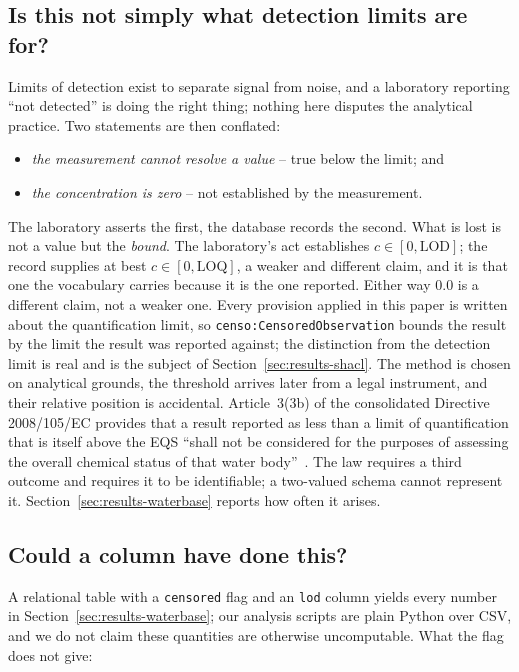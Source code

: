 \subsection{Is this not simply what detection limits are for?}
\label{sec:methods-noise}
Limits of detection exist to separate signal from noise, and a laboratory
reporting ``not detected'' is doing the right thing; nothing here disputes the
analytical practice. Two statements are then conflated:

\begin{itemize}
  \item \emph{the measurement cannot resolve a value} -- true below the limit;
    and
  \item \emph{the concentration is zero} -- not established by the measurement.
\end{itemize}

The laboratory asserts the first, the database records the second. What is lost
is not a value but the \emph{bound}. The laboratory's act establishes $c \in
[0,\mathrm{LOD}]$; the record supplies at best $c \in [0,\mathrm{LOQ}]$, a
weaker and different claim, and it is that one the vocabulary carries because it
is the one reported. Either way \num{0.0} is a different claim, not a weaker
one. Every provision applied in this paper is written about the quantification
limit, so \texttt{censo:CensoredObservation} bounds the result by the limit the
result was reported against; the distinction from the detection limit is real
and is the subject of Section~\ref{sec:results-shacl}. The
method is chosen on analytical grounds, the threshold arrives later from a legal
instrument, and their relative position is accidental. Article~3(3b) of the
consolidated Directive 2008/105/EC provides that a result reported as less than
a limit of quantification that is itself above the EQS ``shall not be considered
for the purposes of assessing the overall chemical status of that water
body''~\cite{eu2008eqs,eu2009qaqc}. The law requires a third outcome and
requires it to be identifiable; a two-valued schema cannot represent it.
Section~\ref{sec:results-waterbase} reports how often it arises.

\subsection{Could a column have done this?}
\label{sec:methods-why}
A relational table with a \texttt{censored} flag and an \texttt{lod} column
yields every number in Section~\ref{sec:results-waterbase}; our analysis scripts
are plain Python over CSV, and we do not claim these quantities are otherwise
uncomputable. What the flag does not give:

